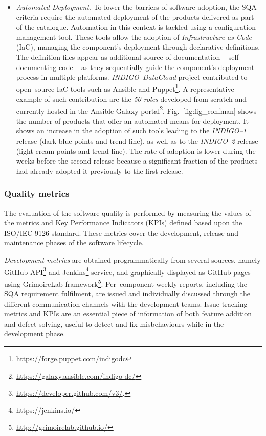 \documentclass[journal]{IEEEtran}
\begin{document}
\begin{itemize}
\item \textit{Automated Deployment}.
To lower the barriers of software adoption, the SQA criteria require the automated
deployment of the products delivered as part of the catalogue. Automation in this context is
tackled using a configuration management tool. These tools allow the adoption of
\textit{Infrastructure as Code} (IaC), managing the component's deployment through declarative
definitions. The definition files appear as additional source of documentation
-- self--documenting code -- as they sequentially guide the component's deployment process in multiple
platforms. {\sl INDIGO--DataCloud} project contributed to open--source IaC tools such
as Ansible
and Puppet\footnote{\url{https://forge.puppet.com/indigodc}}. A representative example of
such contribution are the \textit{50 roles} developed from scratch and currently hosted in
the Ansible Galaxy portal\footnote{\url{https://galaxy.ansible.com/indigo-dc/}}. Fig.~\ref{fig:fig_confman}
shows the number of products that offer an automated means for deployment.
It shows an increase in the adoption of such tools leading to the {\sl INDIGO--1} release
(dark blue points and trend line), as well as to the {\sl INDIGO--2} release
(light cream points and trend line). The rate of adoption is lower during the weeks
before the second release because a significant fraction of the products had already adopted it
previously to the first release.
\end{itemize}

\subsubsection{Quality metrics}

The evaluation of the software quality is performed by measuring the values of
the metrics and Key Performance Indicators (KPIs) defined based upon the
ISO/IEC 9126 standard. These metrics cover the development, release and
maintenance phases of the software lifecycle.

\textit{Development metrics} are obtained programmatically from several sources, namely GitHub
API\footnote{\url{https://developer.github.com/v3/}.}
and Jenkins\footnote{\url{https://jenkins.io/}} service, and graphically displayed as GitHub
pages using GrimoireLab framework\footnote{\url{http://grimoirelab.github.io/}}.
Per--component weekly reports, including the SQA requirement
fulfilment, are issued and individually discussed through the different communication channels
with the development teams. Issue tracking metrics and KPIs are an essential piece of information
of both feature addition and defect solving, useful to detect and fix misbehaviours while in the
development phase.
\end{document}
